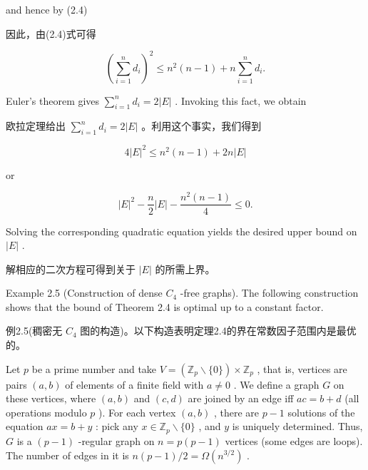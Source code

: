 \documentclass[10pt]{article}
\begin{document}
and hence by (2.4)

\begin{tcolorbox}\relax
因此，由(2.4)式可得
\end{tcolorbox}

\[
{\left( \mathop{\sum }\limits_{{i = 1}}^{n}{d}_{i}\right) }^{2} \leq  {n}^{2}\left( {n - 1}\right)  + n\mathop{\sum }\limits_{{i = 1}}^{n}{d}_{i}.
\]

Euler’s theorem gives \(\mathop{\sum }\limits_{{i = 1}}^{n}{d}_{i} = 2\left| E\right|\) . Invoking this fact, we obtain

\begin{tcolorbox}\relax
欧拉定理给出 \(\mathop{\sum }\limits_{{i = 1}}^{n}{d}_{i} = 2\left| E\right|\) 。利用这个事实，我们得到
\end{tcolorbox}

\[
4{\left| E\right| }^{2} \leq  {n}^{2}\left( {n - 1}\right)  + {2n}\left| E\right|
\]

or

\[
{\left| E\right| }^{2} - \frac{n}{2}\left| E\right|  - \frac{{n}^{2}\left( {n - 1}\right) }{4} \leq  0.
\]

Solving the corresponding quadratic equation yields the desired upper bound on \(\left| E\right|\) .

\begin{tcolorbox}\relax
解相应的二次方程可得到关于 \(\left| E\right|\) 的所需上界。
\end{tcolorbox}

Example 2.5 (Construction of dense \({C}_{4}\) -free graphs). The following construction shows that the bound of Theorem 2.4 is optimal up to a constant factor.

\begin{tcolorbox}\relax
例2.5(稠密无 \({C}_{4}\) 图的构造)。以下构造表明定理2.4的界在常数因子范围内是最优的。
\end{tcolorbox}

Let \(p\) be a prime number and take \(V = \left( {{\mathbb{Z}}_{p}\smallsetminus \{ 0\} }\right)  \times  {\mathbb{Z}}_{p}\) , that is, vertices are pairs \(\left( {a,b}\right)\) of elements of a finite field with \(a \neq  0\) . We define a graph \(G\) on these vertices, where \(\left( {a,b}\right)\) and \(\left( {c,d}\right)\) are joined by an edge iff \({ac} = b + d\) (all operations modulo \(p\) ). For each vertex \(\left( {a,b}\right)\) , there are \(p - 1\) solutions of the equation \({ax} = b + y\) : pick any \(x \in  {\mathbb{Z}}_{p} \smallsetminus  \{ 0\}\) , and \(y\) is uniquely determined. Thus, \(G\) is a \(\left( {p - 1}\right)\) -regular graph on \(n = p\left( {p - 1}\right)\) vertices (some edges are loops). The number of edges in it is \(n\left( {p - 1}\right) /2 = \Omega \left( {n}^{3/2}\right)\) .
\end{document}
